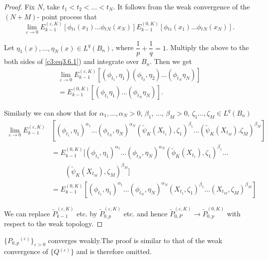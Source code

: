 \begin{proof}
  Fix $N$, take $t_1 < t_2 <  \dots < t_N$. It follows from the weak
  convergence of the $(N+M)$- point process that  
  \begin{equation*}
    \lim_{\varepsilon \to 0} E^{(\varepsilon,K)}_{k-1} \left[\phi{_t{_i}}(
      x_1) \dots \phi{_t{_N}}( x_N) \right]  E^{(0,K)}_{k-1} \left[\phi{_t{_i}}(
      x_1) \dots \phi{_t{_N}}( x_N) \right]. \tag{3.6.1}\label{c3:eq3.6.1} 
  \end{equation*}

Let $\eta_1( x ),\ldots, \eta_N(x) \in L^q (B_n)$, where
$\dfrac{1}{p} + \dfrac{1}{q} = 1$. Multiply the above to the both
sides of \eqref{c3:eq3.6.1}) and integrate over $B_n$. Then we get  
\begin{multline*}
  \lim_{\varepsilon \to 0} E^{(\varepsilon,K)}_{k-1} \left[(\phi_{t_1},
    \eta_1)  (\phi_{t_2}, \eta_2) \dots (\phi_{t_N} \eta_N)\right]\\ 
  = E^{(0,K)}_{k-1}  \left[(\phi_{t_1} \eta_1) \dots (\phi_{t_N}
  \eta_N)\right]. \tag{3.6.2}\label{c3:eq3.6.2} 
\end{multline*}

Similarly we can show that for $\alpha_1, \ldots,\alpha_N > 0$, $\beta_1$,
$\ldots$, $\beta_M > 0$, $\zeta_1 \ldots,\zeta_M  \in  L^q (B_n)$  
\begin{align*}
  \lim_{\varepsilon \to 0}  E^{(\varepsilon,K)}_{k-1} &
  \left[(\phi_{t_1}, \eta_1)^{\alpha_1} \dots (\phi_{t_N} ,  \eta_N)^{\alpha_N}
    (\tilde{\psi}_K (X_{t_1}), \zeta_1)^{\beta_1} \ldots
(\tilde{\psi}_K (X_{t_M}) .  \zeta_M)^{\beta_M}\right]\\ 
& = E^{(0,K)}_{k-1} [(\phi_{t_1} , \eta_1)^{\alpha_1} \ldots
    (\phi_{t_N}, \eta_N)^{\alpha_N} (\tilde{\phi}_K (X_{t_1}),
    \zeta_1)^{\beta_1} \ldots\\
    &\qquad (\tilde{\psi}_K (X_{t_M}),
    \zeta_M)^{\beta_M}]\\[4pt]
& = E^{(0,K)}_{k-1} [(\phi_{t_1}, \eta_1)^{\alpha_1} \ldots
    (\phi_{t_N}, \eta_N)^{\alpha_N} (X_{t_1}, \zeta_1)^{\beta_1}
    \ldots (X_{t_M}, \zeta_M)^{\beta_M}]
\end{align*}

We can replace $\tilde{P}^{(\varepsilon,K)}_{k-1}$ etc. by
$\tilde{P}^{(\varepsilon,K)}_{0,p}$ etc. and hence
$\tilde{P}^{(\varepsilon,K)}_{0,P} \to \tilde{P}^{(0,K)}_{0, p}$ with
respect to the weak topology. 
\end{proof}

\setcounter{proposition}{2}
\begin{proposition}\label{c3:prop3.6.3}\pageoriginale %
  $\{ P_{0,p}{^{(\varepsilon)}}\}_{\varepsilon > 0}$ converges
  weakly.The proof is similar to that of the weak convergence of
  $\{Q{^{(\varepsilon)}}\}$ and is therefore omitted. 
\end{proposition}

